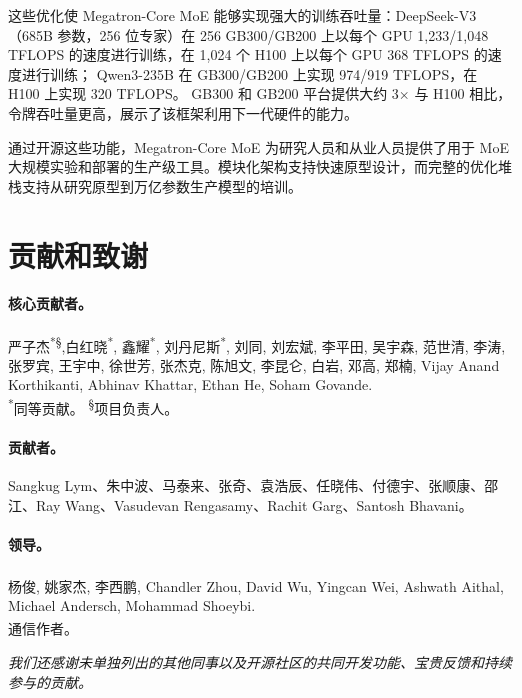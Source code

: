 \documentclass[10pt,logo,copyright]{nvidiatechreport_zh}
\begin{document}
这些优化使 Megatron-Core MoE 能够实现强大的训练吞吐量：DeepSeek-V3（685B 参数，256 位专家）在 256 GB300/GB200 上以每个 GPU 1,233/1,048 TFLOPS 的速度进行训练，在 1,024 个 H100 上以每个 GPU 368 TFLOPS 的速度进行训练； Qwen3-235B 在 GB300/GB200 上实现 974/919 TFLOPS，在 H100 上实现 320 TFLOPS。 GB300 和 GB200 平台提供大约 3$\times$ 与 H100 相比，令牌吞吐量更高，展示了该框架利用下一代硬件的能力。

通过开源这些功能，Megatron-Core MoE 为研究人员和从业人员提供了用于 MoE 大规模实验和部署的生产级工具。模块化架构支持快速原型设计，而完整的优化堆栈支持从研究原型到万亿参数生产模型的培训。


\section*{贡献和致谢}
\label{sec:contributions}


\paragraph{核心贡献者。}
严子杰\textsuperscript{*\S},白红晓\textsuperscript{*}, 鑫耀\textsuperscript{*}, 刘丹尼斯\textsuperscript{*}, 刘同, 刘宏斌, 李平田, 吴宇森, 范世清, 李涛, 张罗宾, 王宇中, 徐世芳, 张杰克, 陈旭文, 李昆仑, 白岩, 邓高, 郑楠, Vijay Anand Korthikanti, Abhinav Khattar, Ethan He, Soham Govande.\\
{\small \textsuperscript{*}同等贡献。 \textsuperscript{\S}项目负责人。}

\paragraph{贡献者。}
Sangkug Lym、朱中波、马泰来、张奇、袁浩辰、任晓伟、付德宇、张顺康、邵江、Ray Wang、Vasudevan Rengasamy、Rachit Garg、Santosh Bhavani。

\paragraph{领导。}
杨俊\textsuperscript{\dag}, 姚家杰\textsuperscript{\dag}, 李西鹏, Chandler Zhou, David Wu, Yingcan Wei, Ashwath Aithal, Michael Andersch, Mohammad Shoeybi.\\
{\small \textsuperscript{\dag}通信作者。}

\vspace{0.5em}
\noindent\textit{我们还感谢未单独列出的其他同事以及开源社区的共同开发功能、宝贵反馈和持续参与的贡献。}
\end{document}
